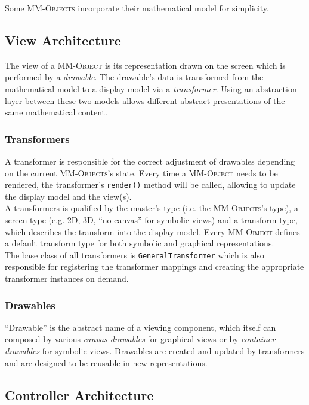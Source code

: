 \documentclass[a4paper,12pt]{article}
\newcommand{\name}[1]{\textsc{#1}}
\newcommand{\codename}[1]{\texttt{\small #1}}
\newcommand{\mmo}{\name{MM-Object }}
\newcommand{\mmos}{\name{MM-Objects }}
\begin{document}
Some \mmos incorporate their mathematical model for simplicity.

\vspace{1.0cm}

\subsection{View Architecture}

The view of a \mmo is its representation drawn on the screen which is performed by a \textit{drawable}.
The drawable's data is transformed from the mathematical model to a display model via a \textit{transformer}.
Using an abstraction layer between these two models allows different abstract presentations of the same
mathematical content.

\subsubsection*{Transformers}

A transformer is responsible for the correct adjustment of drawables depending on the current \name{MM-Objects}'s
state. Every time a \mmo needs to be rendered, the transformer's \codename{render()} method will be called,
allowing to update the display model and the view(s).\\
A transformers is qualified by the master's type (i.e. the \name{MM-Objects}'s type), a screen type 
(e.g. 2D, 3D, ``no canvas'' for symbolic views) and a transform type, which describes the transform
into the display model. Every \mmo defines a default transform type for both symbolic and graphical representations.\\
The base class of all transformers is \codename{GeneralTransformer} which is also responsible for registering
the transformer mappings and creating the appropriate transformer instances on demand.

\subsubsection*{Drawables}

``Drawable'' is the abstract name of a viewing component, which itself can composed by various 
\textit{canvas drawables} for graphical views or by \textit{container drawables} for symbolic views.
Drawables are created and updated by transformers and are designed to be reusable in new representations.


\newpage

\subsection{Controller Architecture}
\end{document}
